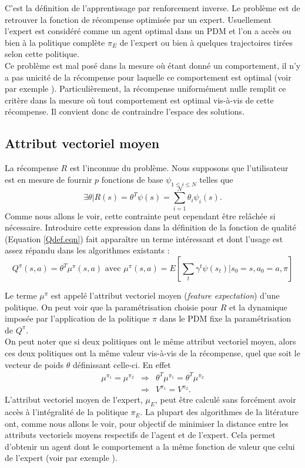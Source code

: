 \documentclass[publibook-draft]{CAp2012}
\begin{document}
C'est la définition de l'apprentissage par renforcement inverse. Le problème est de retrouver la fonction de récompense optimisée par un expert. Usuellement l'expert est considéré comme un agent optimal dans un PDM et l'on a accès ou bien à la politique complète $\pi_E$ de l'expert ou bien à quelques trajectoires tirées selon cette politique.\\

Ce problème est mal posé dans la mesure où étant donné un comportement, il n'y a pas unicité de la récompense pour laquelle ce comportement est optimal (voir par exemple \cite{ng1999policy}). Particulièrement, la récompense uniformément nulle remplit ce critère dans la mesure où tout comportement est optimal vis-à-vis de cette récompense. Il convient donc de contraindre l'espace des solutions.
\subsection{Attribut vectoriel moyen}
\label{ConsiderationsTechniques.sec}
La récompense $R$ est l'inconnue du problème. Nous supposons que l'utilisateur est en mesure de fournir $p$ fonctions de base $\psi_{1\leq i \leq N}$ telles que
\begin{equation}
\label{hatRdef.eqn}
\exists \theta | R(s) = \theta^T\psi(s) = \sum_{i=1}^N\theta_i\psi_i(s).
\end{equation}
Comme nous allons le voir, cette contrainte peut cependant être relâchée si nécessaire. Introduire cette expression dans la définition de la fonction de qualité (Equation \eqref{Qdef.eqn}) fait apparaître un terme intéressant et dont l'usage est assez répandu dans les algorithmes existants :
\begin{equation}
Q^\pi(s,a) = \theta^T\mu^\pi(s,a) \textrm{ avec } \mu^\pi(s,a) = E[\sum_t\gamma^t\psi(s_t)|s_0=s,a_0=a,\pi]
\label{Qmu.eqn}
\end{equation}

Le terme $\mu^\pi$ est appelé l'attribut vectoriel moyen ({\it feature expectation}) d'une politique. On peut voir que la paramétrisation choisie pour $R$ et la dynamique imposée par l'application de la politique $\pi$ dans le PDM fixe la paramétrisation de $Q^\pi$.\\

On peut noter que si deux politiques ont le même attribut vectoriel moyen, alors ces deux politiques ont la même valeur vis-à-vis de la récompense, quel que soit le vecteur de poids $\theta$ définissant celle-ci. En effet
\begin{eqnarray}
\mu^{\pi_1} = \mu^{\pi_2} &\Rightarrow& \theta^T\mu^{\pi_1} = \theta^T\mu^{\pi_2}\\
& \Rightarrow& V^{\pi_1} = V^{\pi_2}.
\label{memevaleur.eqn}
\end{eqnarray}
L'attribut vectoriel moyen de l'expert, $\mu_E$, peut être calculé sans forcément avoir accès à l'intégralité de la politique $\pi_E$. La plupart des algorithmes de la litérature ont, comme nous allons le voir, pour objectif de minimiser la distance entre les attributs vectoriels moyens respectifs de l'agent et de l'expert. Cela permet d'obtenir un agent dont le comportement a la même fonction de valeur que celui de l'expert (voir par exemple \cite{neu2009training}).
\end{document}

